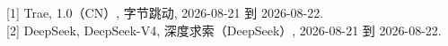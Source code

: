 
[1] Trae, 1.0（CN）, 字节跳动, 2026-08-21 到 2026-08-22.\\

[2] DeepSeek, DeepSeek-V4, 深度求索（DeepSeek）, 2026-08-21 到 2026-08-22.\\
